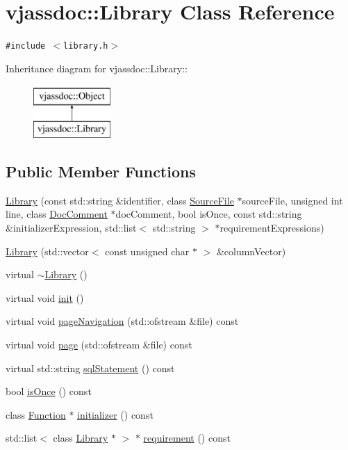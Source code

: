 \hypertarget{classvjassdoc_1_1Library}{
\section{vjassdoc::Library Class Reference}
\label{classvjassdoc_1_1Library}
}
{\tt \#include $<$library.h$>$}

Inheritance diagram for vjassdoc::Library::\begin{figure}[H]
\begin{center}
\leavevmode
\includegraphics[height=2cm]{classvjassdoc_1_1Library}
\end{center}
\end{figure}
\subsection*{Public Member Functions}
\begin{CompactItemize}
\item 
\hyperlink{classvjassdoc_1_1Library_9f69ca5b7692f0351f1ac263c9b3bf28}{Library} (const std::string \&identifier, class \hyperlink{classvjassdoc_1_1SourceFile}{SourceFile} $\ast$sourceFile, unsigned int line, class \hyperlink{classvjassdoc_1_1DocComment}{DocComment} $\ast$docComment, bool isOnce, const std::string \&initializerExpression, std::list$<$ std::string $>$ $\ast$requirementExpressions)
\item 
\hyperlink{classvjassdoc_1_1Library_2e9ab1441cf3e30919312c8f3644f190}{Library} (std::vector$<$ const unsigned char $\ast$ $>$ \&columnVector)
\item 
virtual \hyperlink{classvjassdoc_1_1Library_412120c44682db1ae36a04254583eb75}{$\sim$Library} ()
\item 
virtual void \hyperlink{classvjassdoc_1_1Library_d1bbc6153d45c040be60419a6708bd7d}{init} ()
\item 
virtual void \hyperlink{classvjassdoc_1_1Library_782d6d0f5d58756924f0ab413821967a}{pageNavigation} (std::ofstream \&file) const 
\item 
virtual void \hyperlink{classvjassdoc_1_1Library_b49718631812ed3a5bcfe0a5bdf7595e}{page} (std::ofstream \&file) const 
\item 
virtual std::string \hyperlink{classvjassdoc_1_1Library_21dd8d48803fa96b2b22cb9846c9b915}{sqlStatement} () const 
\item 
bool \hyperlink{classvjassdoc_1_1Library_c80f46bebe911d249c7d7fdbc9fa3f5b}{isOnce} () const 
\item 
class \hyperlink{classvjassdoc_1_1Function}{Function} $\ast$ \hyperlink{classvjassdoc_1_1Library_99bc875c90c8ca4062dcddc8c4f7c8c6}{initializer} () const 
\item 
std::list$<$ class \hyperlink{classvjassdoc_1_1Library}{Library} $\ast$ $>$ $\ast$ \hyperlink{classvjassdoc_1_1Library_aa5627b4a2e5b730d3dbc7d141a0e6ef}{requirement} () const 
\end{CompactItemize}


